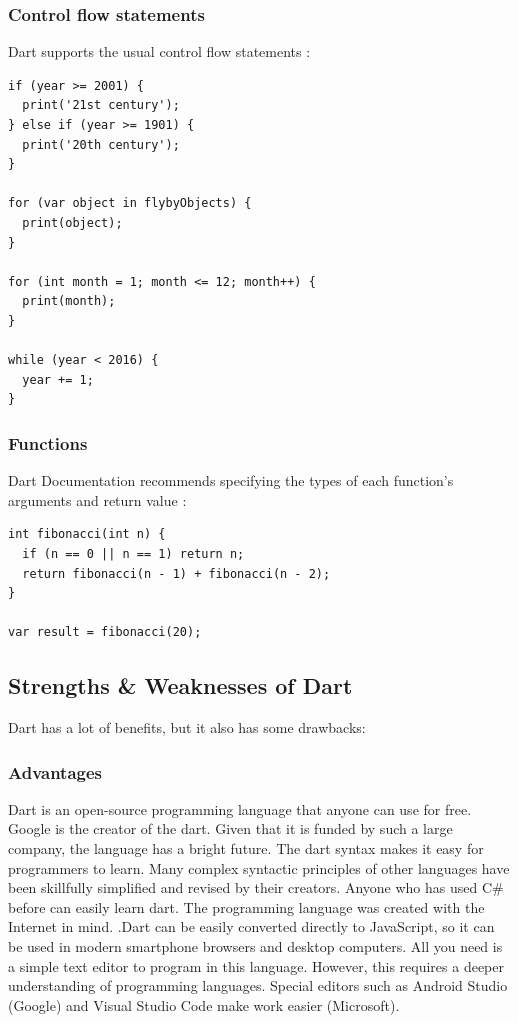 \subsubsection{Control flow statements}
Dart supports the usual control flow statements \cite{LanguageSampleDart:online}:
\begin{verbatim}
if (year >= 2001) {
  print('21st century');
} else if (year >= 1901) {
  print('20th century');
}

for (var object in flybyObjects) {
  print(object);
}

for (int month = 1; month <= 12; month++) {
  print(month);
}

while (year < 2016) {
  year += 1;
}
\end{verbatim}

\subsubsection{Functions}
Dart Documentation recommends specifying the types of each function’s arguments and return value \cite{LanguageSampleDart:online}:

\begin{verbatim}
int fibonacci(int n) {
  if (n == 0 || n == 1) return n;
  return fibonacci(n - 1) + fibonacci(n - 2);
}

var result = fibonacci(20);
\end{verbatim}

\subsection{Strengths \& Weaknesses of Dart}
Dart has a lot of benefits, but it also has some drawbacks:
\subsubsection{Advantages}
Dart is an open-source programming language that anyone can use for free. Google is the creator of the dart. Given that it is funded by such a large company, the language has a bright future. The dart syntax makes it easy for programmers to learn. Many complex syntactic principles of other languages have been skillfully simplified and revised by their creators. Anyone who has used C\# before can easily learn dart. The programming language was created with the Internet in mind. .Dart can be easily converted directly to JavaScript, so it can be used in modern smartphone browsers and desktop computers. All you need is a simple text editor to program in this language. However, this requires a deeper understanding of programming languages. Special editors such as Android Studio (Google) and Visual Studio Code make work easier (Microsoft).

